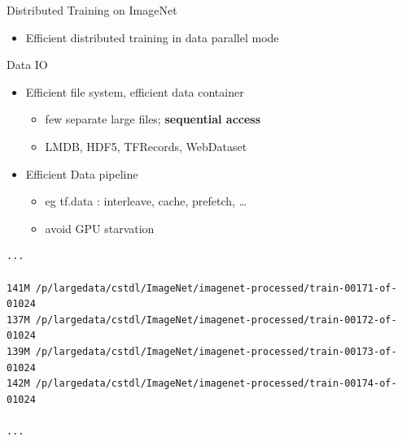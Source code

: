 \begin{frame}[fragile]{Distributed Training on ImageNet}
\protect\hypertarget{distributed-training-on-imagenet-6}{}
\begin{itemize}
\tightlist
\item
  Efficient distributed training in data parallel mode
\end{itemize}

\begin{block}{Data IO}
\protect\hypertarget{data-io}{}
\begin{itemize}
\tightlist
\item
  Efficient file system, efficient data container

  \begin{itemize}
  \tightlist
  \item
    few separate large files; \textbf{sequential access}
  \item
    LMDB, HDF5, TFRecords, WebDataset
  \end{itemize}
\item
  Efficient Data pipeline

  \begin{itemize}
  \tightlist
  \item
    eg tf.data : interleave, cache, prefetch, \ldots{}
  \item
    avoid GPU starvation
  \end{itemize}
\end{itemize}
\end{block}

\begin{lstlisting}
...

141M /p/largedata/cstdl/ImageNet/imagenet-processed/train-00171-of-01024
137M /p/largedata/cstdl/ImageNet/imagenet-processed/train-00172-of-01024
139M /p/largedata/cstdl/ImageNet/imagenet-processed/train-00173-of-01024
142M /p/largedata/cstdl/ImageNet/imagenet-processed/train-00174-of-01024

...
\end{lstlisting}
\end{frame}

